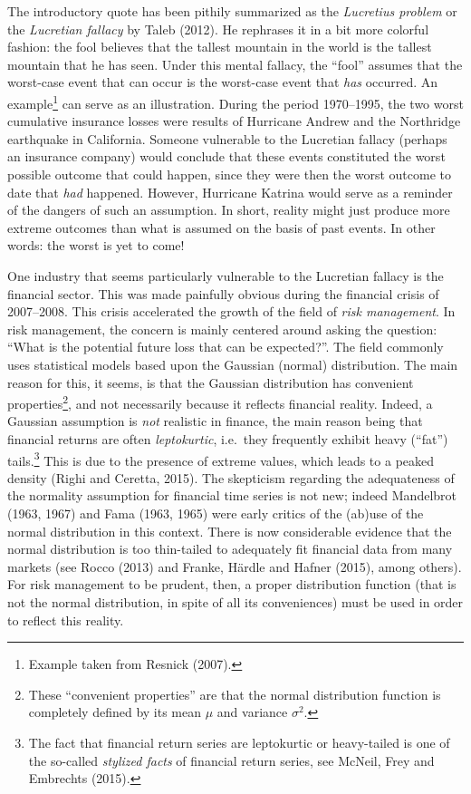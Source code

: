 \documentclass[a4paper,11pt]{article}
\theoremstyle{definition}
\theoremstyle{definition}
\theoremstyle{definition}
\theoremstyle{definition}
\theoremstyle{remark}
\begin{document}
The introductory quote has been pithily summarized as the \emph{Lucretius problem} or the \emph{Lucretian fallacy} by Taleb (2012). He rephrases it in a bit more colorful fashion: the fool believes that the tallest mountain in the world is the tallest mountain that he has seen. Under this mental fallacy, the ``fool'' assumes that the worst-case event that can occur is the worst-case event that \emph{has} occurred. An example\footnote{Example taken from Resnick (2007).} can serve as an illustration. During the period 1970--1995, the two worst cumulative insurance losses were results of Hurricane Andrew and the Northridge earthquake in California. Someone vulnerable to the Lucretian fallacy (perhaps an insurance company) would conclude that these events constituted the worst possible outcome that could happen, since they were then the worst outcome to date that \emph{had} happened. However, Hurricane Katrina would serve as a reminder of the dangers of such an assumption. In short, reality might just produce more extreme outcomes than what is assumed on the basis of past events. In other words: the worst is yet to come!

One industry that seems particularly vulnerable to the Lucretian fallacy is the financial sector. This was made painfully obvious during the financial crisis of 2007--2008. This crisis accelerated the growth of the field of \emph{risk management}. In risk management, the concern is mainly centered around asking the question: ``What is the potential future loss that can be expected?''. The field commonly uses statistical models based upon the Gaussian (normal) distribution. The main reason for this, it seems, is that the Gaussian distribution has convenient properties\footnote{These ``convenient properties'' are that the normal distribution function is completely defined by its mean \(\mu\) and variance \(\sigma^2\).}, and not necessarily because it reflects financial reality. Indeed, a Gaussian assumption is \emph{not} realistic in finance, the main reason being that financial returns are often \emph{leptokurtic}, i.e.~they frequently exhibit heavy (``fat'') tails.\footnote{The fact that financial return series are leptokurtic or heavy-tailed is one of the so-called \emph{stylized facts} of financial return series, see McNeil, Frey and Embrechts (2015).} This is due to the presence of extreme values, which leads to a peaked density (Righi and Ceretta, 2015). The skepticism regarding the adequateness of the normality assumption for financial time series is not new; indeed Mandelbrot (1963, 1967) and Fama (1963, 1965) were early critics of the (ab)use of the normal distribution in this context. There is now considerable evidence that the normal distribution is too thin-tailed to adequately fit financial data from many markets (see Rocco (2013) and Franke, Härdle and Hafner (2015), among others). For risk management to be prudent, then, a proper distribution function (that is not the normal distribution, in spite of all its conveniences) must be used in order to reflect this reality.
\end{document}
